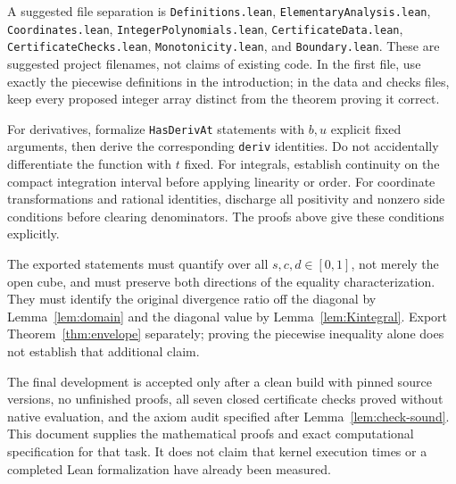 \documentclass[11pt,a4paper]{article}
\theoremstyle{definition}
\newcommand{\lean}[1]{{\small\nolinkurl{#1}}}
\begin{document}
A suggested file separation is \lean{Definitions.lean}, \lean{ElementaryAnalysis.lean}, \lean{Coordinates.lean}, \lean{IntegerPolynomials.lean}, \lean{CertificateData.lean}, \lean{CertificateChecks.lean}, \lean{Monotonicity.lean}, and \lean{Boundary.lean}. These are suggested project filenames, not claims of existing code. In the first file, use exactly the piecewise definitions in the introduction; in the data and checks files, keep every proposed integer array distinct from the theorem proving it correct.

For derivatives, formalize \lean{HasDerivAt} statements with $b,u$ explicit fixed arguments, then derive the corresponding \lean{deriv} identities. Do not accidentally differentiate the function with $t$ fixed. For integrals, establish continuity on the compact integration interval before applying linearity or order. For coordinate transformations and rational identities, discharge all positivity and nonzero side conditions before clearing denominators. The proofs above give these conditions explicitly.

The exported statements must quantify over all $s,c,d\in[0,1]$, not merely the open cube, and must preserve both directions of the equality characterization. They must identify the original divergence ratio off the diagonal by Lemma~\ref{lem:domain} and the diagonal value by Lemma~\ref{lem:Kintegral}. Export Theorem~\ref{thm:envelope} separately; proving the piecewise inequality alone does not establish that additional claim.

The final development is accepted only after a clean build with pinned source versions, no unfinished proofs, all seven closed certificate checks proved without native evaluation, and the axiom audit specified after Lemma~\ref{lem:check-sound}. This document supplies the mathematical proofs and exact computational specification for that task. It does not claim that kernel execution times or a completed Lean formalization have already been measured.
\end{document}
